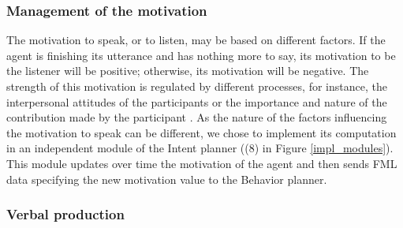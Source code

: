 \documentclass[twocolumn]{svjour3}
\begin{document}
\subsubsection{Management of the motivation}

The motivation to speak, or to listen, may be based on different factors. If the agent is finishing its utterance and has nothing more to say, its motivation to be the listener will be positive; otherwise, its motivation will be negative. The strength of this motivation is regulated by different processes, for instance, the interpersonal attitudes of the participants \citep{ter_maat_how_2010,ravenet_conversational_2015} or the importance and nature of the contribution made by the participant \citep{cafaro_effects_2016}. As the nature of the factors influencing the motivation to speak can be different, we chose to implement its computation in an independent module of the Intent planner ((8) in Figure \ref{impl_modules}). This module updates over time the motivation of the agent and then sends FML data specifying the new motivation value to the Behavior planner. 


\subsubsection{Verbal production}
\end{document}
